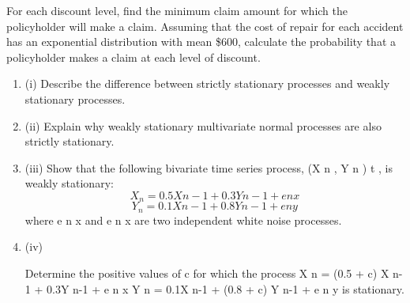 \documentclass[a4paper,12pt]{article}
\begin{document}
For each discount level, find the minimum claim amount for which the policyholder will make a claim. 
Assuming that the cost of repair for each accident has an exponential distribution with mean \$600, calculate the probability that a policyholder makes a claim at each level of discount. 

\begin{enumerate}
    \item (i) Describe the difference between strictly stationary processes and weakly stationary processes.
\item
(ii) Explain why weakly stationary multivariate normal processes are also strictly stationary.
\item 
(iii) Show that the following bivariate time series process, (X n , Y n ) t , is weakly stationary:
\[X_n = 0.5X n-1 + 0.3Y n-1 + e n x\]
\[Y_n = 0.1X n-1 + 0.8Y n-1 + e n y\]
where e n x and e n x are two independent white noise processes.
\item 
(iv)

Determine the positive values of c for which the process
X n = (0.5 + c) X n-1 + 0.3Y n-1 + e n x\]
Y n = 0.1X n-1 + (0.8 + c) Y n-1 + e n y\]
is stationary.
\end{enumerate}
\end{document}
